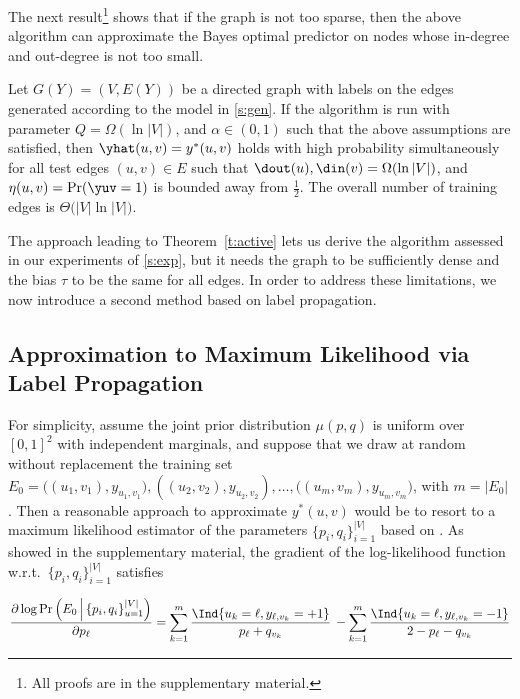 The next result\footnote{All proofs are in the supplementary material.} shows that if the graph is
not too sparse, then the above algorithm can approximate the Bayes optimal predictor on nodes whose
in-degree and out-degree is not too small.

\begin{theorem}
  \label{t:active}
  Let $G(Y) = (V,E(Y))$ be a directed graph with labels on the edges generated according to the
  model in \autoref{s:gen}.
  If the algorithm is run with parameter $Q = \Omega(\ln|V|)$, and $\alpha \in (0,1)$ such that the
  above assumptions are satisfied, then $\yhat(u,v) = y^*(u,v)$ holds with high probability
  simultaneously for all test edges $(u,v) \in E$ such that $\dout(u),\din(v) = \Omega(\ln|V|)$, and
  $\eta(u,v) = \Pr(\yuv=1)$ is bounded away from $\tfrac{1}{2}$.
  The overall number of training edges is $\Theta\big(|V|\ln|V|\big)$.
\end{theorem}

The approach leading to Theorem~\ref{t:active} lets us derive the \usrule{} algorithm assessed in
our experiments of \autoref{s:exp}, but it needs the graph to be sufficiently dense and the bias
$\tau$ to be the same for all edges. In order to address these limitations, we now introduce a
second method based on label propagation.

\subsection{Approximation to Maximum Likelihood via Label Propagation}\label{ss:passive}

For simplicity, assume the joint prior distribution $\mu(p,q)$ is uniform over $[0,1]^2$ with
independent marginals, and suppose that we draw at random without replacement the training set $E_0
= \big((u_1,v_1),y_{u_1,v_1}), ((u_2,v_2),y_{u_2,v_2}), \ldots, ((u_m,v_m),y_{u_m,v_m}\big)$, with
$m = |E_0|$. Then a reasonable approach to approximate $y^*(u,v)$ would be to resort to a maximum
likelihood estimator of the parameters $\{p_i, q_i\}_{i=1}^{|V|}$ based on \trainset{}.
As showed in the supplementary material, the gradient of the log-likelihood function w.r.t.\ $\{p_i,
q_i\}_{i=1}^{|V|}$ satisfies

\begin{equation}\label{e:mlp}
\frac{\partial \log \Pr\left(E_0 \,\Big|\, \{p_i, q_i\}_{u=1}^{|V|}\right)}{\partial p_{\ell}}
=
\sum_{k=1}^m
\frac{\Ind{u_k = \ell,y_{\ell,v_k}=+1}}{p_{\ell}+q_{v_k}}\,
- \sum_{k=1}^m
\frac{\Ind{u_k = \ell,y_{\ell,v_k}=-1}}{2-p_{\ell}-q_{v_k}}
\end{equation}

